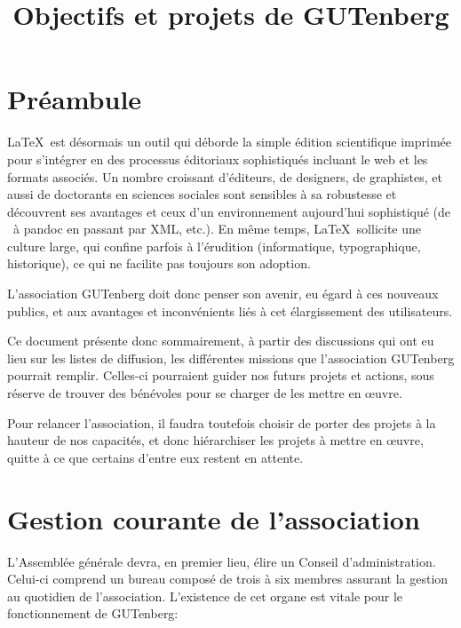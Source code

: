 \documentclass{tufte-handout}
\title{Objectifs et projets de GUTenberg}
\author{}
\date{}
\newcommand{\ratio}[3][]{\marginpar{\footnotesize{\textcolor{teal}{Temps requis: #2 / Utilité: #3}\par\noindent \textcolor{teal}{#1}}}}
\begin{document}
\maketitle


\section*{Préambule}

\LaTeX\ est désormais un outil  qui déborde la simple édition scientifique imprimée pour s'intégrer en des processus éditoriaux sophistiqués incluant  le web et les formats associés. Un nombre croissant d'éditeurs, de  designers, de graphistes, et aussi de doctorants en sciences sociales sont sensibles à sa robustesse et découvrent ses avantages et ceux d'un environnement aujourd'hui sophistiqué (de \LuaLaTeX\ à pandoc en passant par XML, etc.). En même temps, \LaTeX\ sollicite une culture large, qui confine parfois à l'érudition (informatique, typographique, historique), ce qui ne facilite pas toujours son adoption. 
	
L'association GUTenberg doit donc penser son avenir, eu égard à ces nouveaux publics, et aux avantages et inconvénients liés à cet élargissement des utilisateurs.
	
	
Ce document présente donc sommairement, à partir des discussions qui ont eu lieu sur les listes de diffusion, les différentes missions que l'association GUTenberg pourrait remplir. Celles-ci pourraient guider nos futurs projets et actions, sous réserve de trouver des bénévoles pour se charger de les mettre en œuvre.

Pour relancer l'association, il faudra toutefois choisir de porter des projets à la hauteur de nos capacités, et donc hiérarchiser les projets à mettre en œuvre, quitte à ce que certains d'entre eux restent en attente.

\tableofcontents

\clearpage


\section{Gestion courante de l'association}

L'Assemblée générale\ratio[Investissement régulier et dans la durée, les mandats durant 4 ans]{+++}{+++} devra, en premier lieu, élire un Conseil d'administration. Celui-ci comprend un bureau composé de trois à six membres assurant la gestion au quotidien de l'association. L'existence de cet organe est vitale pour le fonctionnement de GUTenberg:
\end{document}
